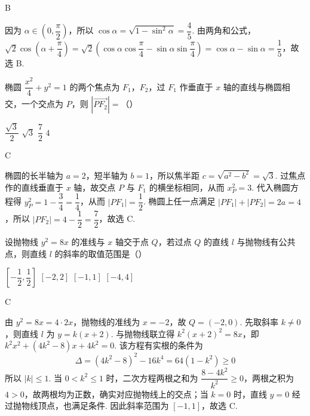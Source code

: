 \begin{answer}
B
\end{answer}

\begin{solution}
因为 \(\alpha\in\left(0,\dfrac\pi2\right)\)，所以 \(\cos\alpha=\sqrt{1-\sin^2\alpha}=\dfrac45\). 由两角和公式，\(\sqrt2\cos\left(\alpha+\dfrac\pi4\right)=\sqrt2\left(\cos\alpha\cos\dfrac\pi4-\sin\alpha\sin\dfrac\pi4\right)=\cos\alpha-\sin\alpha=\dfrac15\)，故选 B.
\end{solution}

\begin{problem}
椭圆 \(\dfrac{x^2}{4}+y^2=1\) 的两个焦点为 \(F_1\)，\(F_2\)，过 \(F_1\) 作垂直于 \(x\) 轴的直线与椭圆相交，一个交点为 \(P\)，则 \(\left|\overrightarrow{PF_2}\right|=\)（\quad）

\choices
    {\(\dfrac{\sqrt3}{2}\)}
    {\(\sqrt3\)}
    {\(\dfrac72\)}
    {\(4\)}
\end{problem}

\begin{answer}
C
\end{answer}

\begin{solution}
椭圆的长半轴为 \(a=2\)，短半轴为 \(b=1\)，所以焦半距 \(c=\sqrt{a^2-b^2}=\sqrt3\). 过焦点作的直线垂直于 \(x\) 轴，故交点 \(P\) 与 \(F_1\) 的横坐标相同，从而 \(x_P^2=3\). 代入椭圆方程得 \(y_P^2=1-\dfrac34=\dfrac14\)，从而 \(|PF_1|=\dfrac12\). 椭圆上任一点满足 \(|PF_1|+|PF_2|=2a=4\)，所以 \(|PF_2|=4-\dfrac12=\dfrac72\)，故选 C.
\end{solution}

\begin{problem}
设抛物线 \(y^2=8x\) 的准线与 \(x\) 轴交于点 \(Q\)，若过点 \(Q\) 的直线 \(l\) 与抛物线有公共点，则直线 \(l\) 的斜率的取值范围是（\quad）

\choices
    {\(\left[-\dfrac12,\dfrac12\right]\)}
    {\([-2,2]\)}
    {\([-1,1]\)}
    {\([-4,4]\)}
\end{problem}

\begin{answer}
C
\end{answer}

\begin{solution}
由 \(y^2=8x=4\cdot2x\)，抛物线的准线为 \(x=-2\)，故 \(Q=(-2,0)\). 先取斜率 \(k\ne0\)，则直线 \(l\) 为 \(y=k(x+2)\). 与抛物线联立得 \(k^2(x+2)^2=8x\)，即 \(k^2x^2+(4k^2-8)x+4k^2=0\). 该方程有实根的条件为
\[
\Delta=(4k^2-8)^2-16k^4=64(1-k^2)\geqslant0
\]
所以 \(|k|\leqslant1\). 当 \(0<k^2\leqslant1\) 时，二次方程两根之和为 \(\dfrac{8-4k^2}{k^2}\geqslant0\)，两根之积为 \(4>0\)，故两根均为正数，确实对应抛物线上的交点；当 \(k=0\) 时，直线 \(y=0\) 经过抛物线顶点，也满足条件. 因此斜率范围为 \([-1,1]\)，故选 C.
\end{solution}

